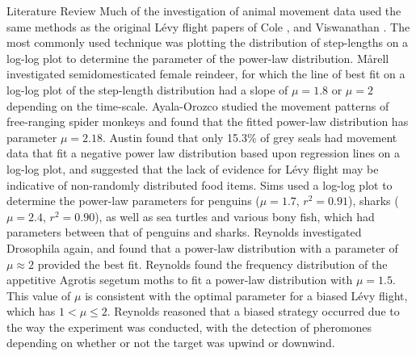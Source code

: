 \begin{section}{Literature Review \label{sec:litreview}}
Much of the investigation of animal movement data used the same methods as the original L\'{e}vy flight papers of Cole \cite{Cole_1995}, and Viswanathan \etal \cite{Viswanathan_1996}.
The most commonly used technique was plotting the distribution of step-lengths on a log-log plot to determine the parameter of the power-law distribution.
Mårell \etal \cite{Marell_2002} investigated semidomesticated female reindeer, for which the line of best fit on a log-log plot of the step-length distribution had a slope of $\mu=1.8$ or $\mu=2$ depending on the time-scale.
Ayala-Orozco \etal \cite{Ayala_Orozco_2004} studied the movement patterns of free-ranging spider monkeys and found that the fitted power-law distribution has parameter $\mu=2.18$.
Austin \etal \cite{Austin_2004} found that only 15.3\% of grey seals had movement data that fit a negative power law distribution based upon regression lines on a log-log plot, and suggested that the lack of evidence for L\'{e}vy flight may be indicative of non-randomly distributed food items.
Sims \etal \cite{Sims_2008} used a log-log plot to determine the power-law parameters for penguins ($\mu=1.7$, $r^2 = 0.91$), sharks ($\mu=2.4$, $r^2=0.90$), as well as sea turtles and various bony fish, which had parameters between that of penguins and sharks.
Reynolds \etal \cite{Reynolds_2009_fractional} investigated Drosophila again, and found that a power-law distribution with a parameter of $\mu \approx 2$ provided the best fit.
Reynolds \etal \cite{Reynolds_2007_moths} found the frequency distribution of the appetitive Agrotis segetum moths to fit a power-law distribution with $\mu=1.5$.
This value of $\mu$ is consistent with the optimal parameter for a biased L\'{e}vy flight, which has $1 < \mu \leq 2$.
Reynolds \etal \cite{Reynolds_2007_moths} reasoned that a biased strategy occurred due to the way the experiment was conducted, with the detection of pheromones depending on whether or not the target was upwind or downwind.


\end{section}
